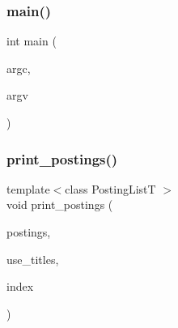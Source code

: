 \subsubsection{\texorpdfstring{main()}{main()}}
{\footnotesize\ttfamily int main (\begin{DoxyParamCaption}\item[{int}]{argc,  }\item[{char $\ast$$\ast$}]{argv }\end{DoxyParamCaption})}

\mbox{\label{irk-postings_8cpp_a8fd168baf0349318b98384a15e1ed018}} 
\subsubsection{\texorpdfstring{print\+\_\+postings()}{print\_postings()}}
{\footnotesize\ttfamily template$<$class Posting\+ListT $>$ \\
void print\+\_\+postings (\begin{DoxyParamCaption}\item[{const Posting\+ListT \&}]{postings,  }\item[{bool}]{use\+\_\+titles,  }\item[{const \mbox{\hyperlink{namespaceirk_a137711df98ba695c3526ba4004853a47}{irk\+::inverted\+\_\+index\+\_\+view}} \&}]{index }\end{DoxyParamCaption})}

